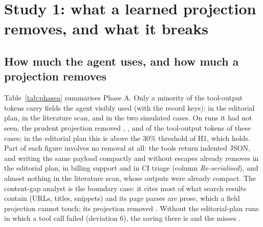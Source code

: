 \section{Study 1: what a learned projection removes, and what it breaks}
\label{sec:study1}

\subsection{How much the agent uses, and how much a projection removes}

Table~\ref{tab:phasea} summarises Phase A. Only a minority of the tool-output tokens carry fields the agent
visibly used (with the record keys): \PhaseAUsedSharei{} in the editorial plan, \PhaseAUsedShareiii{} in the
literature scan, \PhaseAUsedShareiv{} and \PhaseAUsedSharev{} in the two simulated cases. On runs it had not seen,
the prudent projection removed \PhaseAPrudentSavingi, \PhaseAPrudentSavingiii, \PhaseAPrudentSavingiv{} and
\PhaseAPrudentSavingv{} of the tool-output tokens of these cases; in the editorial plan this is above the 30\%
threshold of H1, which holds. Part of each figure involves no removal at all: the tools return indented JSON, and
writing the same payload compactly and without escapes already removes \ReserialAi{} in the editorial plan,
\ReserialAiv{} in billing support and \ReserialAv{} in CI triage (column \emph{Re-serialised}), and almost nothing
in the literature scan, whose outputs were already compact. The content-gap analyst is the boundary case: it cites
most of what search results contain (URLs, titles, snippets) and its page parses are prose, which a field projection
cannot touch; its projection removed \PhaseAPrudentSavingii. Without the \PhaseASensExcludedi{} editorial-plan
runs in which a tool call failed (deviation 6), the saving there is \PhaseASensSavingi{} and the misses
\PhaseASensMissesi.

\begin{table}[t]
\centering\small
\resizebox{\textwidth}{!}{}
\caption{Phase A, eight live runs per case. \emph{Used}: share of tool-output tokens left by the in-sample
aggressive projection (used fields and record keys): detected reuse, not an exact measure of use. \emph{Re-serialised}: change from
re-serialising each JSON output compactly, with no field removed (the lossless part of the next two columns).
\emph{Prudent}, \emph{Aggressive}:
change in tool-output tokens on held-out runs. \emph{Misses}: held-out calls in which the aggressive projection
removes a field the run used later, learning from everything the agent wrote, or only from tool calls.
$^\dagger$Simulated tools.}
\label{tab:phasea}
\end{table}

